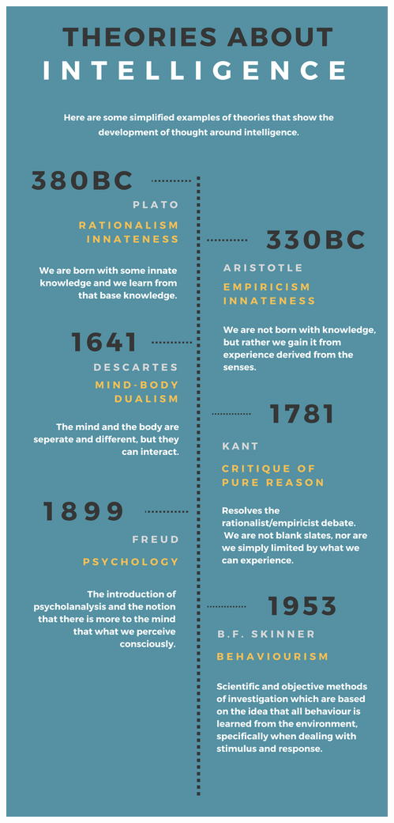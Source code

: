 \documentclass[11pt]{article}
\begin{document}
\includegraphics[width=\textwidth,height=\textheight,keepaspectratio]{images/img}
\end{document}
